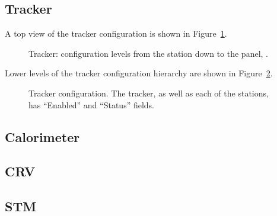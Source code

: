 

\subsection{Tracker} 

A top view of the tracker configuration is shown in Figure~\ref{figure:tracker_config}.

\begin{figure}[H]
  \caption{
    \label{figure:tracker_config}
    Tracker: configuration levels from the station down to the panel, .
  }
\end{figure}


Lower levels of the tracker configuration hierarchy are shown in Figure~\ref{figure:station_config}.

\begin{figure}[H]
  \caption{
    \label{figure:station_config}
    Tracker configuration. The tracker, as well as each of the stations, has ``Enabled'' and
    ``Status'' fields.
  }
\end{figure}

\subsection{Calorimeter} 


\subsection{CRV} 


\subsection{STM} 




